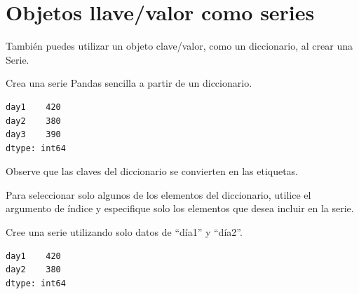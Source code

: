 \section{Objetos llave/valor como series}

También puedes utilizar un objeto clave/valor, como un diccionario, al crear una Serie.\\

\begin{code} Crea una serie Pandas sencilla a partir de un diccionario.

\begin{Shaded}
\begin{Highlighting}[]

\OperatorTok{=}\NormalTok{ \{}\NormalTok{: }\NormalTok{, }\NormalTok{: }\NormalTok{, }\NormalTok{: }\NormalTok{\}}

\OperatorTok{=}

\end{Highlighting}
\end{Shaded}

\begin{verbatim}
day1    420
day2    380
day3    390
dtype: int64
\end{verbatim}
\end{code}

Observe que las claves del diccionario se convierten en las etiquetas.

Para seleccionar solo algunos de los elementos del diccionario, utilice
el argumento de índice y especifique solo los elementos que desea
incluir en la serie. \\

\begin{code} Cree una serie utilizando solo datos de ``día1'' y ``día2''.

\begin{Shaded}
\begin{Highlighting}[]

\OperatorTok{=}\NormalTok{ \{}\NormalTok{: }\NormalTok{, }\NormalTok{: }\NormalTok{, }\NormalTok{: }\NormalTok{\}}

\OperatorTok{=}\OperatorTok{=}\NormalTok{ [}\NormalTok{, }\NormalTok{])}

\end{Highlighting}
\end{Shaded}

\begin{verbatim}
day1    420
day2    380
dtype: int64
\end{verbatim}
\end{code}


